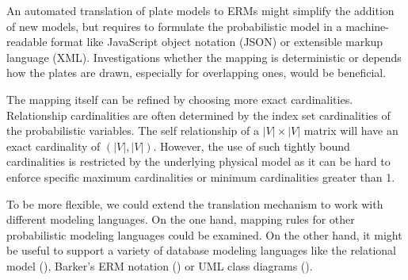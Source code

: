 An automated translation of plate models to ERMs might simplify the addition of new models, but requires to formulate the probabilistic model in a machine-readable format like JavaScript object notation (JSON) or extensible markup language (XML). Investigations whether the mapping is deterministic or depends how the plates are drawn, especially for overlapping ones, would be beneficial.

The mapping itself can be refined by choosing more exact cardinalities. Relationship cardinalities are often determined by the index set cardinalities of the probabilistic variables. The self relationship of a $|V| \times |V|$ matrix will have an exact cardinality of $(|V|, |V|)$. However, the use of such tightly bound cardinalities is restricted by the underlying physical model as it can be hard to enforce specific maximum cardinalities or minimum cardinalities greater than 1.

To be more flexible, we could extend the translation mechanism to work with different modeling languages. On the one hand, mapping rules for other probabilistic modeling languages could be examined. On the other hand, it might be useful to support a variety of database modeling languages like the relational model (\cite{codd1970relational}), Barker's ERM notation (\cite{barker1990case}) or UML class diagrams (\cite{rumbaugh2004unified}).
